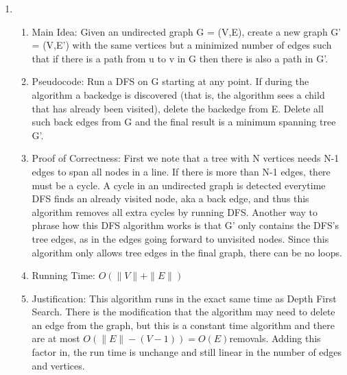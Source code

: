 \documentclass[11pt]{article}
\newenvironment{qparts}{\begin{enumerate}[{(}a{)}]}{\end{enumerate}}
\begin{document}
\begin{qparts}
\item
\begin{enumerate}
\item Main Idea: Given an undirected graph G = (V,E), create a new graph G' = (V,E') with the same vertices but a minimized number of edges such that if there is a path from u to v in G then there is also a path in G'.
\item Pseudocode: Run a DFS on G starting at any point. If during the algorithm a backedge is discovered (that is, the algorithm sees a child that has already been visited), delete the backedge from E. Delete all such back edges from G and the final result is a minimum spanning tree G'.
\item Proof of Correctness: First we note that a tree with N vertices needs N-1 edges to span all nodes in a line. If there is more than N-1 edges, there must be a cycle. A cycle in an undirected graph is detected everytime DFS finds an already visited node, aka a back edge, and thus this algorithm removes all extra cycles by running DFS. Another way to phrase how this DFS algorithm works is that G' only contains the DFS's tree edges, as in the edges going forward to unvisited nodes. Since this algorithm only allows tree edges in the final graph, there can be no loops.
\item Running Time: $O(\|V\|+\|E\|)$
\item Justification: This algorithm runs in the exact same time as Depth First Search. There is the modification that the algorithm may need to delete an edge from the graph, but this is a constant time algorithm and there are at most $O(\|E\| - (V-1)) = O(E) $removals. Adding this factor in, the run time is unchange and still linear in the number of edges and vertices.
\end{enumerate}


\end{qparts}
\end{document}
